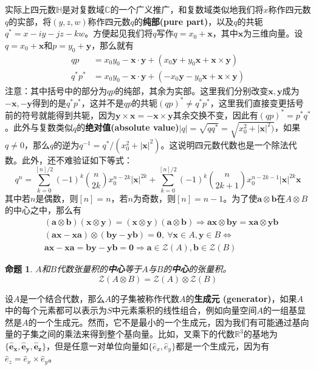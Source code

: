 \documentclass[mathserif,hyperref,UTF8,openany,b5paper]{ctexbook}
\newtheorem{pro}{命题}[section]
\begin{document}
实际上四元数$\mathbb{H}$是对复数域$\mathbb{C}$的一个广义推广，和复数域类似地我们将$x$称作四元数$q$的实部，将$(y,z,w)$称作四元数$q$的\textbf{纯部(pure part)}，以及$q$的共轭$q^*=x-iy-jz-kw$。方便起见我们将$q$写作$q=x_0+\mathbf{x}$，其中$\mathbf{x}$为三维向量。设$q=x_0+\mathbf{x}$和$p=y_0+\mathbf{y}$，那么就有
\begin{align}
    qp&=x_0y_0-\mathbf{x\cdot y} + (x_0 \mathbf{y}+y_0 \mathbf{x}+\mathbf{x\times y})\\
    q^*p^*&=x_0y_0-\mathbf{x\cdot y} +(-x_0 \mathbf{y}- y_0 \mathbf{x}+\mathbf{x\times y})
\end{align}
注意：其中括号中的部分为$qp$的纯部，其余为实部。这里我们分别改变$\mathbf{x},\mathbf{y}$成为$-\mathbf{x},-\mathbf{y}$得到的是$q^*p^*$，这并不是$qp$的共轭$(qp)^*\neq q^*p^*$，这里我们直接变更括号前的符号就能得到共轭，因为$\mathbf{y\times x=-x\times y}$其余交换不变，因此有$\boxed{(qp)^*=p^*q^*}$。此外与复数类似$q$的\textbf{绝对值(absolute value)}$|q|=\sqrt{qq^*}=\sqrt{x_0^2+|\mathbf{x}|^2)}$，如果$q\neq 0$，那么$q$的逆为$q^{-1}=q^*/(x_0^2+|\mathbf{x}|^2)$。这说明四元数代数也是一个除法代数。此外，还不难验证如下等式：
\begin{equation}
    q^n=\sum_{k=0}^{[n]/2}(-1)^k\binom{n}{2k}x_0^{n-2k}|\mathbf{x}|^{2k}+\sum_{k=0}^{[n]/2}(-1)^k\binom{n}{2k+1}x_0^{n-2k-1}|\mathbf{x}|^{2k}\mathbf{x}
\end{equation}
其中若$n$是偶数，则$[n]=n$，若$n$为奇数，则$[n]=n-1$。为了使$\mathbf{a\otimes b}$在$A\otimes B$的中心之中，那么有\begin{align}
    &(\mathbf{a}\otimes\mathbf{b})(\mathbf{x}\otimes\mathbf{y})=(\mathbf{x}\otimes\mathbf{y})(\mathbf{a}\otimes\mathbf{b})\Rightarrow\mathbf{ax}\otimes\mathbf{by}=\mathbf{xa}\otimes\mathbf{yb}\\
    &\mathbf{(ax-xa)}\otimes\mathbf{(by-yb)=0},\ \forall \mathbf{x}\in A,\mathbf{y}\in B \Leftrightarrow\\
    &\mathbf{ax-xa=by-yb=0} \Rightarrow \mathbf{a}\in\mathcal{Z}(A),\mathbf{b}\in\mathcal{Z}(B)
\end{align}
\begin{pro}
    $A$和$B$代数张量积的\textbf{中心}等于$A$与$B$的\textbf{中心}的张量积。
\begin{equation}
    \boxed{\mathcal{Z}(A\otimes B)=\mathcal{Z}(A)\otimes\mathcal{Z}(B)}
\end{equation}
\end{pro}
设$A$是一个结合代数，那么$A$的子集被称作代数$A$的\textbf{生成元 (generator)}，如果$A$中的每个元素都可以表示为$S$中元素乘积的线性组合，例如向量空间$A$的一组基显然是$A$的一个生成元。然而，它不是最小的一个生成元，因为我们有可能通过基向量的子集之间的乘法来得到整个基向量。比如，叉乘下的代数$\mathbb{R}^3$的基地为$\{\mathbf{\hat{e}_x,\hat{e}_y,\hat{e}_z}\}$，但是任意一对单位向量如$\{\hat{e}_x,\hat{e}_y\}$都是一个生成元，因为有$\hat{e}_z=\hat{e}_x\times \hat{e}_y$。
\end{document}
